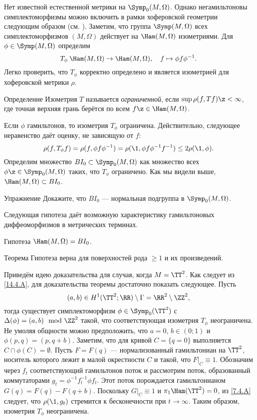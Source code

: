 Нет известной естественной метрики на $\Symp_0(M,\Omega)$.
Однако негамильтоновы симплектоморфизмы можно включить в рамки
хоферовской геометрии следующим образом (см. \cite{LP}). 
Заметим, что группа $\Symp(M,\Omega)$ всех симплектоморфизмов
$(M,\Omega)$ действует на $\Ham(M,\Omega)$ изометриями.
Для $\phi \in \Symp(M,\Omega)$ определим 
\[T_\phi\: \Ham(M,\Omega) \to \Ham(M,\Omega),
\quad
f \mapsto \phi f\phi^{-1}.\]
Легко проверить, что $T_\phi$ корректно определено и является
изометрией для хоферовской метрики $\rho$. 

\begin{ex*}{Определение}
Изометрия $T$ называется \emph{ограниченной}, если $\sup \rho(f, Tf)\z<\infty$, где
точная верхняя грань берётся по всем $f\z\in\Ham(M,\Omega)$. 
\end{ex*}


Если $\phi$ гамильтонов, то изометрия $T_\phi$ ограничена.
Действительно, следующее неравенство даёт оценку, не зависящую от $f$:
\[\rho(f,T_\phi f) = \rho(f,\phi f\phi^{-1}) = \rho(\1,\phi
f\phi^{-1}f^{-1})\le 2\rho(\1, \phi).\] 
Определим множество $BI_0 \subset \Symp_0(M,\Omega)$ как множество
всех $\phi \z\in \Symp_0(M,\Omega)$ таких, что $T_\phi$ ограничено. 
Как мы видели выше, $\Ham(M,\Omega)\subset BI_0$.

\begin{ex}{Упражнение}\label{14.4.A}
Докажите, что $BI_0$ — нормальная подгруппа в $\Symp_0(M,\Omega)$.
\end{ex}

Следующая гипотеза даёт возможную характеристику гамильтоновых
диффеоморфизмов в метрических терминах. 

\begin{ex*}{Гипотеза}
$\Ham(M,\Omega) = BI_0$.
\end{ex*}

\begin{thm}[(\cite{LP})]{Теорема}\label{14.4.B}
Гипотеза верна для поверхностей рода $\ge1$ и их произведений.
\end{thm}

Приведём идею доказательства для случая, когда $M=\TT^2$.
Как следует из \ref{14.4.A}, для доказательства теоремы достаточно
показать следующее.
Пусть
\[(a,b)\in H^1(\TT^2;\RR)\setminus\Gamma=\RR^2\setminus\ZZ^2,\]
тогда существует симплектоморфизм $\phi\in\Symp_0(\TT^2)$ с $\Delta
(\phi) = (a, b) \mod \ZZ^2$ такой, что соответствующая изометрия
$T_\phi$ неограничена. 
Не умоляя общности можно предположить, что $a= 0$, $b \in (0; 1)$ и $\phi(p, q) = (p, q + b)$.
Заметим, что для кривой $C = \{q = 0\}$ выполняется $C \cap \phi(C) = \emptyset$.
Пусть $F = F(q)$ — нормализованный гамильтониан на $\TT^2$, носитель
которого лежит в малой окрестности $C$ и такой, что $F|_C \equiv 1$. 
Обозначим через $f_t$ соответствующий гамильтонов поток и рассмотрим
поток, образованный коммутаторами $g_t = \phi^{-1}f_t^{-1}\phi f_t$. 
Этот поток порождается гамильтонианом $G(q) = F(q) - F(q + b)$.
Поскольку $G|_C \equiv 1$ {и $\pi_{1}\Ham(\TT^{2})=0$}, из \ref{7.4.A} следует, что $\rho(\1, g_t)$
стремится к бесконечности при $t \to \infty$. 
Таким образом, изометрия $T_\phi$ неограничена.


